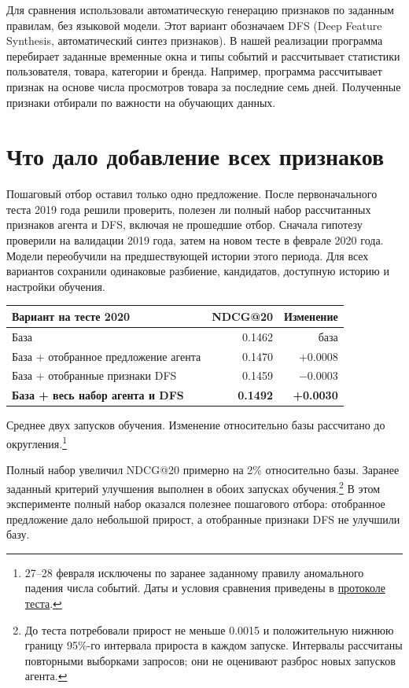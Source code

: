 \documentclass[11pt,a4paper]{article}
\newcommand{\repo}[2]{\href{https://github.com/suprend/tlab-recsys-2026-task1/blob/3f8915dd5979d58709aa9442cdd79b79662dc6d1/#1}{#2}}
\begin{document}
Для сравнения использовали автоматическую генерацию признаков по заданным правилам, без языковой модели. Этот вариант обозначаем DFS (Deep Feature Synthesis, автоматический синтез признаков). В нашей реализации программа перебирает заданные временные окна и типы событий и рассчитывает статистики пользователя, товара, категории и бренда. Например, программа рассчитывает признак на основе числа просмотров товара за последние семь дней. Полученные признаки отбирали по важности на обучающих данных.

\section{Что дало добавление всех признаков}
Пошаговый отбор оставил только одно предложение. После первоначального теста 2019 года решили проверить, полезен ли полный набор рассчитанных признаков агента и DFS, включая не прошедшие отбор. Сначала гипотезу проверили на валидации 2019 года, затем на новом тесте в феврале 2020 года. Модели переобучили на предшествующей истории этого периода. Для всех вариантов сохранили одинаковые разбиение, кандидатов, доступную историю и настройки обучения.

\begin{center}\small
\begin{tabularx}{\linewidth}{@{}Yrr@{}}
\toprule
\textbf{Вариант на тесте 2020} & \textbf{NDCG@20} & \textbf{Изменение}\\
\midrule
База & 0.1462 & база\\
База + отобранное предложение агента & 0.1470 & +0.0008\\
База + отобранные признаки DFS & 0.1459 & $-0.0003$\\
\textbf{База + весь набор агента и DFS} & \textbf{0.1492} & \textbf{+0.0030}\\
\bottomrule
\end{tabularx}
\end{center}
Среднее двух запусков обучения. Изменение относительно базы рассчитано до округления.\footnote{27--28 февраля исключены по заранее заданному правилу аномального падения числа событий. Даты и условия сравнения приведены в \repo{task1/runs/replication-2020/spec.md}{протоколе теста}.}

Полный набор увеличил NDCG@20 примерно на 2\% относительно базы. Заранее заданный критерий улучшения выполнен в обоих запусках обучения.\footnote{До теста потребовали прирост не меньше 0.0015 и положительную нижнюю границу 95\%-го интервала прироста в каждом запуске. Интервалы рассчитаны повторными выборками запросов; они не оценивают разброс новых запусков агента.} В этом эксперименте полный набор оказался полезнее пошагового отбора: отобранное предложение дало небольшой прирост, а отобранные признаки DFS не улучшили базу.
\end{document}
